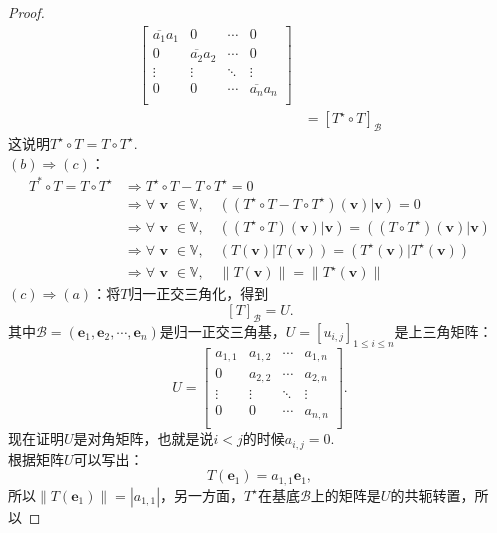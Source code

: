 \documentclass[12pt,UTF8]{ctexbook}
\begin{document}
\begin{proof}
\begin{align*}
\begin{bmatrix}
            \overline{a_1}a_1 & 0 & \cdots & 0 \\
            0 & \overline{a_2}a_2 & \cdots & 0 \\
            \vdots & \vdots & \ddots & \vdots \\
            0 & 0 & \cdots & \overline{a_n}a_n \\
        \end{bmatrix}  \\
        &= [T^\star\circ T]_{\mathcal{B}} 
    \end{align*}
    这说明$T^\star\circ T = T\circ T^\star.$\\
    $(b)\Rightarrow (c)$：
    \begin{align*}
        T^*\circ T = T\circ T^\star &\Rightarrow T^\star\circ T - T\circ T^\star = 0  \\
        &\Rightarrow \forall \,\, \mathbf{v} \,\, \in\mathbb{V}, \quad ((T^\star\circ T - T\circ T^\star)(\mathbf{v})|\mathbf{v}) = 0  \\
        &\Rightarrow \forall \,\, \mathbf{v} \,\, \in\mathbb{V}, \quad ((T^\star\circ T)(\mathbf{v})|\mathbf{v}) = ((T\circ T^\star)(\mathbf{v})|\mathbf{v})  \\
        &\Rightarrow \forall \,\, \mathbf{v} \,\, \in\mathbb{V}, \quad (T(\mathbf{v})|T(\mathbf{v})) = (T^\star(\mathbf{v})|T^\star(\mathbf{v}))  \\
        &\Rightarrow \forall \,\, \mathbf{v} \,\, \in\mathbb{V}, \quad \|T(\mathbf{v})\| = \|T^\star(\mathbf{v})\|  
    \end{align*}
    $(c)\Rightarrow (a)$：将$T$归一正交三角化，得到
    $$ [T]_{\mathcal{B}} = U.$$
    其中${\mathcal{B}} = (\mathbf{e}_1, \mathbf{e}_2, \cdots , \mathbf{e}_n)$是归一正交三角基，$U = [u_{i,j}]_{1\leqslant i \leqslant n}$是上三角矩阵：
    $$U = \begin{bmatrix}
        a_{1,1} & a_{1,2} & \cdots & a_{1,n} \\
        0 & a_{2,2} & \cdots & a_{2,n} \\
        \vdots & \vdots & \ddots & \vdots \\
        0 & 0 & \cdots & a_{n,n} \\
    \end{bmatrix}.
    $$ 
    现在证明$U$是对角矩阵，也就是说$i<j$的时候$a_{i,j} = 0$.\\
    根据矩阵$U$可以写出：
    $$ T(\mathbf{e}_1) = a_{1,1} \mathbf{e}_1,$$
    所以$\| T(\mathbf{e}_1)\| = |a_{1,1}|$，另一方面，$T^\star$在基底${\mathcal{B}}$上的矩阵是$U$的共轭转置，所以

\end{proof}
\end{document}
